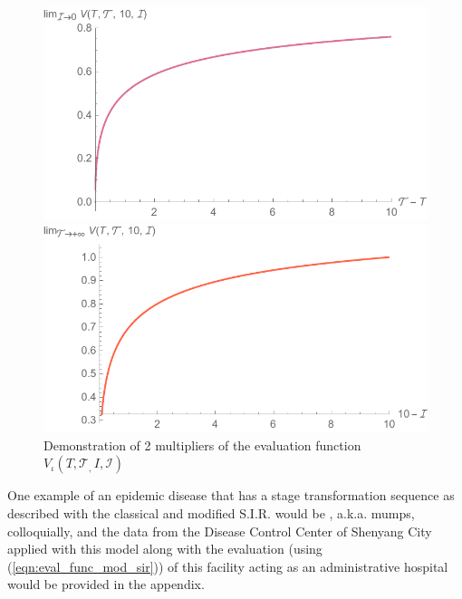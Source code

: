 \documentclass{article}
\begin{document}
\begin{figure}[htbp]
    \centering
    \begin{minipage}[t]{0.5\textwidth}
        \centering
        \includegraphics[width=\textwidth]{EvalFuncMSIR1.pdf} %
    \end{minipage}\hfill
    \begin{minipage}[t]{0.5\textwidth}
        \centering
        \includegraphics[width=\textwidth]{EvalFuncMSIR2.pdf} %
    \end{minipage}
    \caption{Demonstration of 2 multipliers of the evaluation function $V_\iota\left(T,\mathcal{T}_,\,I,\mathcal{I}\right)$}
    \label{fig:msir_eval_func_plot}
\end{figure}

One example of an epidemic disease that has a stage transformation sequence as described with the classical and modified S.I.R. would be , a.k.a. mumps, colloquially, and the data from the Disease Control Center of Shenyang City applied with this model along with the evaluation (using (\ref{eqn:eval_func_mod_sir})) of this facility acting as an administrative hospital would be provided in the appendix.
\end{document}
